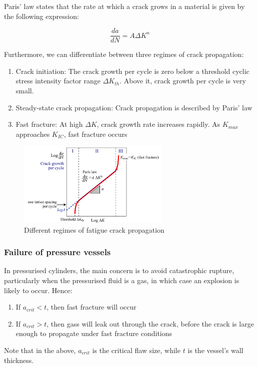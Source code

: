 \documentclass{article}
\begin{document}
\begin{theorem}
    Paris' law states that the rate at which a crack grows in a material is given by the following expression:

    \[ \frac{da}{dN} = A\Delta K^n \]
\end{theorem}

Furthermore, we can differentiate between three regimes of crack propagation:

\begin{enumerate}
    \item Crack initiation: The crack growth per cycle is zero below a threshold cyclic stress intensity factor range $\Delta K_{th}$. Above it, crack growth per cycle is very small.
    \item Steady-state crack propagation: Crack propagation is described by Paris' law
    \item Fast fracture: At high $\Delta K$, crack growth rate increases rapidly. As $K_{max}$ approaches $K_{IC}$, fast fracture occurs
\end{enumerate}

\begin{figure}[h]
    \centering
    \includegraphics[width = 0.65\textwidth]{images/paris.png}
    \caption{Different regimes of fatigue crack propagation}
    \label{fig:enter-label}
\end{figure}

\subsubsection{Failure of pressure vessels}

\begin{theorem}
    In pressurised cylinders, the main concern is to avoid catastrophic rupture, particularly when the pressurised fluid is a gas, in which case an explosion is likely to occur. Hence:
    \begin{enumerate}
        \item If $a_{crit} < t$, then fast fracture will occur
        \item If $a_{crit} > t$, then gass will leak out through the crack, before the crack is large enough to propagate under fast fracture conditions
    \end{enumerate}
    Note that in the above, $a_{crit}$ is the critical flaw size, while $t$ is the vessel's wall thickness.
\end{theorem}
\end{document}
